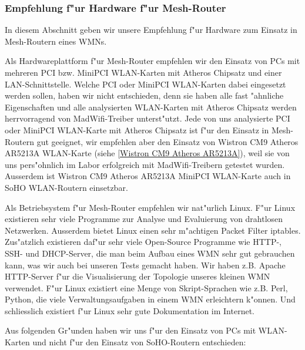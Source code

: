 \subsubsection{Empfehlung f"ur Hardware f"ur Mesh-Router}

In diesem Abschnitt geben wir unsere Empfehlung f"ur Hardware zum Einsatz in
Mesh-Routern eines WMNs.

Als Hardwareplattform f"ur Mesh-Router empfehlen wir den Einsatz von PCs mit
mehreren PCI bzw. MiniPCI WLAN-Karten mit Atheros Chipsatz und einer
LAN-Schnittstelle. Welche PCI oder MiniPCI WLAN-Karten dabei eingesetzt
werden sollen, haben wir nicht entschieden, denn sie haben alle fast
"ahnliche Eigenschaften und alle analysierten WLAN-Karten mit Atheros
Chipsatz werden herrvorragend von MadWifi-Treiber unterst"utzt.
Jede von uns analysierte PCI oder MiniPCI WLAN-Karte mit Atheros
Chipsatz ist f"ur den Einsatz in Mesh-Routern gut geeignet, wir empfehlen
aber den Einsatz von Wistron CM9 Atheros AR5213A WLAN-Karte
(siehe \ref{Wistron CM9 Atheros AR5213A}), weil sie von uns pers"ohnlich
im Labor erfolgreich mit MadWifi-Treibern getestet wurden.
Ausserdem ist Wistron CM9 Atheros AR5213A MiniPCI WLAN-Karte auch
in SoHO WLAN-Routern einsetzbar.

Als Betriebsystem f"ur Mesh-Router empfehlen wir nat"urlich Linux.
F"ur Linux existieren sehr viele Programme zur Analyse und Evaluierung
von drahtlosen Netzwerken. Ausserdem bietet Linux einen sehr m"achtigen
Packet Filter iptables. Zus"atzlich existieren daf"ur sehr viele Open-Source
Programme wie HTTP-, SSH- und DHCP-Server, die man beim Aufbau eines WMN sehr
gut gebrauchen kann, was wir auch bei unseren Tests gemacht haben.
Wir haben z.B. Apache HTTP-Server f"ur die Visualisierung der Topologie
unseres kleinen WMN verwendet. F"ur Linux existiert eine Menge von
Skript-Sprachen wie z.B. Perl, Python, die viele Verwaltungsaufgaben
in einem WMN erleichtern k"onnen. Und schliesslich existiert f"ur Linux
sehr gute Dokumentation im Internet.

Aus folgenden Gr"unden haben wir uns f"ur den Einsatz von PCs mit
WLAN-Karten und nicht f"ur den Einsatz von SoHO-Routern entschieden:

